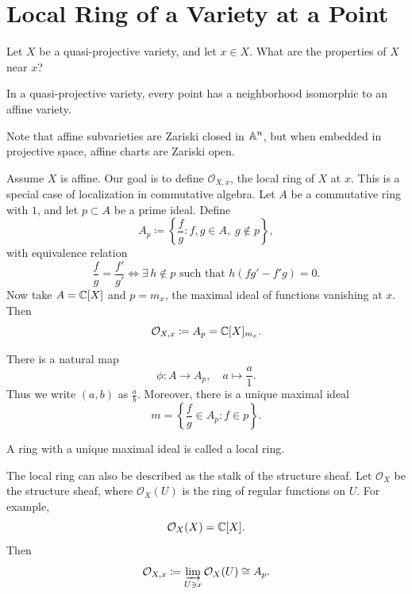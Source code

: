 
\section{Local Ring of a Variety at a Point}

Let $X$ be a quasi-projective variety, and let $x\in X$.
What are the properties of $X$ near $x$?

\begin{theorem*}{
    In a quasi-projective variety, every point has a neighborhood isomorphic to an affine variety.
}
\end{theorem*}

Note that affine subvarieties are Zariski closed in $\aa^n$, but when embedded in projective space, affine charts are Zariski open.

\begin{definition}
    Assume $X$ is affine.
    Our goal is to define $\mathcal{O}_{X,x}$, the local ring of $X$ at $x$.
    This is a special case of localization in commutative algebra.
    Let $A$ be a commutative ring with $1$, and let $p\subset A$ be a prime ideal.
    Define
    \[
        A_p \coloneqq \left\{\frac{f}{g} : f,g\in A,\; g\notin p\right\},
    \]
    with equivalence relation
    \[
        \frac{f}{g} = \frac{f'}{g'} \iff \exists\, h\notin p \text{ such that } h(fg' - f'g)=0.
    \]
    Now take $A = \c[X]$ and $p = m_x$, the maximal ideal of functions vanishing at $x$.
    Then
    \[
        \mathcal{O}_{X,x} \coloneqq A_p = \c[X]_{m_x}.
    \]
\end{definition}

There is a natural map
\[
    \phi: A \to A_p,\quad a \mapsto \frac{a}{1}.
\]
Thus we write $(a,b)$ as $\frac{a}{b}$.
Moreover, there is a unique maximal ideal
\[
    m = \left\{\frac{f}{g}\in A_p : f\in p\right\}.
\]

\begin{definition}
    A ring with a unique maximal ideal is called a local ring.
\end{definition}

\begin{definition}
    The local ring can also be described as the stalk of the structure sheaf.
    Let $\mathcal{O}_X$ be the structure sheaf, where $\mathcal{O}_X(U)$ is the ring of regular functions on $U$.
    For example,
    \[
        \mathcal{O}_X(X) = \c[X].
    \]
    Then
    \[
        \mathcal{O}_{X,x} \coloneqq \varinjlim_{U\ni x} \mathcal{O}_X(U) \cong A_p.
    \]
\end{definition}

